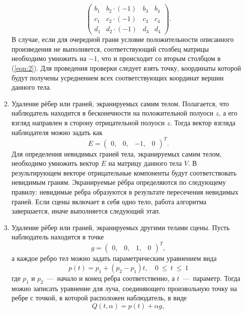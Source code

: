 \begin{enumerate}[label={\arabic*)}]
\begin{equation}
\begin{pmatrix}
			b_{1} & b_{2} \cdot (-1) & b_{3} & b_{4}\\
			c_{1} & c_{2} \cdot (-1) & c_{3} & c_{4}\\
			d_{1} & d_{2} \cdot (-1) & d_{3} & d_{4}
		\end{pmatrix}.
	\end{equation} В случае, если для очередной грани условие положительности описанного произведения не выполняется, соответствующий столбец матрицы необходимо умножить на $-1$, что и происходит со вторым столбцом в (\ref{eqn:2}). Для проведения проверки следует взять точку, координаты которой будут получены усреднением всех соответствующих координат вершин данного тела.
	\item Удаление рёбер или граней, экранируемых самим телом. Полагается, что наблюдатель находится в бесконечности на положительной полуоси $z$, а его взгляд направлен в сторону отрицательной полуоси $z$. Тогда вектор взгляда наблюдателя можно задать как \begin{equation}
		E = \begin{pmatrix} 0, & 0, & -1, & 0 \end{pmatrix}^{T}.
	\end{equation}
	Для определения невидимых граней тела, экранируемых самим телом, необходимо умножить вектор $E$ на матрицу данного тела $V$. В результирующем векторе отрицательные компоненты будут соответствовать невидимым граням. Экранируемые рёбра определяются по следующему правилу: невидимые ребра образуются в результате пересечения невидимых граней. Если сцены включает в себя одно тело, работа алгоритма завершается, иначе выполняется следующий этап.
	\item Удаление рёбер или граней, экранируемых другими телами сцены. Пусть наблюдатель находится в точке \begin{equation}
		g = \begin{pmatrix} 0, & 0, & 1, & 0 \end{pmatrix}^{T},
	\end{equation}
	а каждое ребро тел можно задать параметрическим уравнением вида \begin{equation}
		p(t) = p_1 + (p_2 - p_1)t, \quad 0~\le~t~\le~1
	\end{equation}
	где $p_1$ и $p_2$~---~начало и конец ребра соответственно, а $t$~---~параметр. Тогда можно записать уравнение для луча, соединяющего произвольную точку на ребре с точкой, в которой расположен наблюдатель, в виде \begin{equation}
		Q(t, \alpha) = p(t) + \alpha g,

\end{equation}
\end{enumerate}
